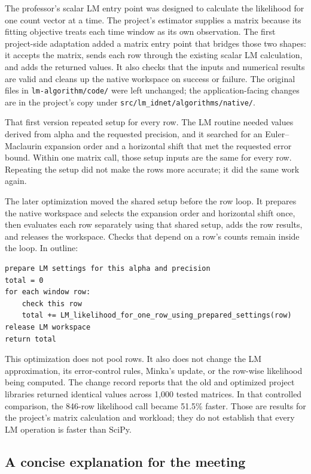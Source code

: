 \documentclass[11pt]{article}
\begin{document}
The professor's scalar LM entry point was designed to calculate the likelihood
for one count vector at a time. The project's estimator supplies a matrix
because its fitting objective treats each time window as its own observation.
The first project-side adaptation added a matrix entry point that bridges those
two shapes: it accepts the matrix, sends each row through the existing scalar
LM calculation, and adds the returned values. It also checks that the inputs
and numerical results are valid and cleans up the native workspace on success
or failure. The original files in \texttt{lm-algorithm/code/} were left
unchanged; the application-facing changes are in the project's copy under
\texttt{src/lm\_idnet/algorithms/native/}.

That first version repeated setup for every row. The LM routine needed values
derived from alpha and the requested precision, and it searched for an
Euler--Maclaurin expansion order and a horizontal shift that met the requested
error bound. Within one matrix call, those setup inputs are the same for every
row. Repeating the setup did not make the rows more accurate; it did the same
work again.

The later optimization moved the shared setup before the row loop. It prepares
the native workspace and selects the expansion order and horizontal shift once,
then evaluates each row separately using that shared setup, adds the row
results, and releases the workspace. Checks that depend on a row's counts
remain inside the loop. In outline:
\begin{verbatim}
prepare LM settings for this alpha and precision
total = 0
for each window row:
    check this row
    total += LM_likelihood_for_one_row_using_prepared_settings(row)
release LM workspace
return total
\end{verbatim}

This optimization does not pool rows. It also does not change the LM
approximation, its error-control rules, Minka's update, or the row-wise
likelihood being computed. The change record reports that the old and optimized
project libraries returned identical values across 1,000 tested matrices. In
that controlled comparison, the 846-row likelihood call became 51.5\% faster.
Those are results for the project's matrix calculation and workload; they do
not establish that every LM operation is faster than SciPy.

\subsection{A concise explanation for the meeting}
\end{document}
